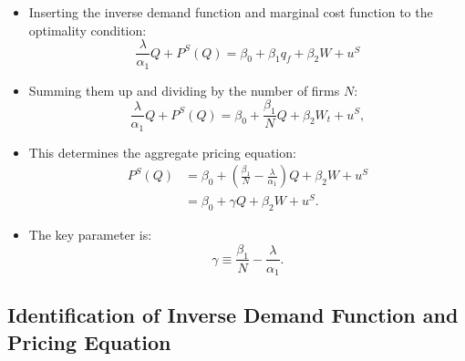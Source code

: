\documentclass[
]{book}
\providecommand{\tightlist}{%
  \setlength{\itemsep}{0pt}\setlength{\parskip}{0pt}}
\begin{document}
\begin{itemize}
\tightlist
\item
  Inserting the inverse demand function and marginal cost function to the optimality condition:
  \begin{equation}
  \frac{\lambda}{\alpha_1} Q + P^S(Q) = \beta_0 + \beta_1 q_f + \beta_2 W + u^S
  \end{equation}
\item
  Summing them up and dividing by the number of firms \(N\):
  \begin{equation}
  \frac{\lambda}{\alpha_1} Q + P^S(Q) = \beta_0 + \frac{\beta_1}{N} Q + \beta_2 W_t + u^S,
  \end{equation}
\item
  This determines the aggregate pricing equation:
  \begin{equation}
  \begin{split}
  P^S(Q) &= \beta_0 + (\frac{\beta_1}{N} - \frac{\lambda}{\alpha_1})Q + \beta_2 W + u^S\\
  &= \beta_0 + \gamma Q + \beta_2 W + u^S.
  \end{split}
  \end{equation}
\item
  The key parameter is:
  \begin{equation}
  \gamma \equiv \frac{\beta_1}{N} - \frac{\lambda}{\alpha_1}.
  \end{equation}
\end{itemize}

\hypertarget{identification-of-inverse-demand-function-and-pricing-equation}{%
\subsection{Identification of Inverse Demand Function and Pricing Equation}\label{identification-of-inverse-demand-function-and-pricing-equation}}
\end{document}
